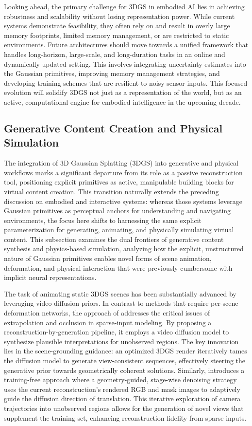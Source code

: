 \documentclass[11pt,a4paper]{article}
\begin{document}
Looking ahead, the primary challenge for 3DGS in embodied AI lies in achieving robustness and scalability without losing representation power. While current systems demonstrate feasibility, they often rely on and result in overly large memory footprints, limited memory management, or are restricted to static environments. Future architectures should move towards a unified framework that handles long-horizon, large-scale, and long-duration tasks in an online and dynamically updated setting. This involves integrating uncertainty estimates into the Gaussian primitives, improving memory management strategies, and developing training schemes that are resilient to noisy sensor inputs. This focused evolution will solidify 3DGS not just as a representation of the world, but as an active, computational engine for embodied intelligence in the upcoming decade.


\subsection{Generative Content Creation and Physical Simulation}


The integration of 3D Gaussian Splatting (3DGS) into generative and physical workflows marks a significant departure from its role as a passive reconstruction tool, positioning explicit primitives as active, manipulable building blocks for virtual content creation. This transition naturally extends the preceding discussion on embodied and interactive systems: whereas those systems leverage Gaussian primitives as perceptual anchors for understanding and navigating environments, the focus here shifts to harnessing the same explicit parameterization for generating, animating, and physically simulating virtual content. This subsection examines the dual frontiers of generative content synthesis and physics-based simulation, analyzing how the explicit, unstructured nature of Gaussian primitives enables novel forms of scene animation, deformation, and physical interaction that were previously cumbersome with implicit neural representations.

The task of animating static 3DGS scenes has been substantially advanced by leveraging video diffusion priors. In contrast to methods that require per-scene deformation networks, the approach of \cite{arxiv:2503.05082v1} addresses the critical issues of extrapolation and occlusion in sparse-input modeling. By proposing a reconstruction-by-generation pipeline, it employs a video diffusion model to synthesize plausible interpretations for unobserved regions. The key innovation lies in the scene-grounding guidance: an optimized 3DGS render iteratively tames the diffusion model to generate view-consistent sequences, effectively steering the generative prior towards geometrically coherent solutions. Similarly, \cite{arxiv:2605.11424v1} introduces a training-free approach where a geometry-guided, stage-wise denoising strategy uses the current reconstruction's rendered RGB and mask images to adaptively guide the diffusion direction of translation. This iterative exploration of camera trajectories into unobserved regions allows for the generation of novel views that supplement the training set, enhancing reconstruction fidelity from sparse inputs.
\end{document}

